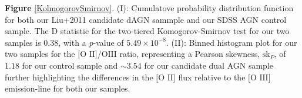 \label{KolmogorovSmirnov} \textbf{Figure} \ref{KolmogorovSmirnov}. (I): Cumulatove probability distribution function for both our Liu+2011 candidate dAGN sammple and our SDSS AGN control sample. The D statistic for the two-tiered Komogorov-Smirnov test for our two samples is 0.38, with a \textit{p}-value of $5.49\times10^{-8}$. (II): Binned histogram plot for our two samples for the $\text{[O II]}/\text{OIII}$ ratio, representing a Pearson skewness, $\text{sk}_{P}$, of $1.18$ for our control sample and $\sim{3.54}$ for our candidate dual AGN sample further highlighting the differences in the $\text{[O II]}$ flux relative to the $\text{[O III]}$ emission-line for both our samples.
  